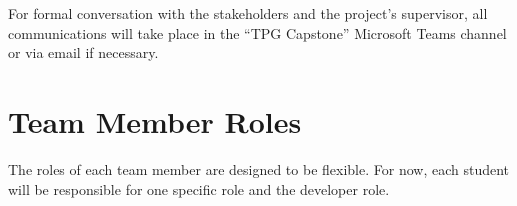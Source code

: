 \documentclass{article}
\begin{document}
\vspace*{10pt}

\noindent For formal conversation with the stakeholders and the project’s supervisor, all communications will take place in the “TPG Capstone” Microsoft Teams channel or via email if necessary.

\section{Team Member Roles}
The roles of each team member are designed to be flexible. For now, each student will be responsible for one specific role and the developer role.
\end{document}
